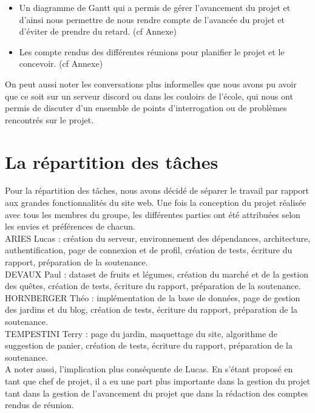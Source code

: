 \documentclass[12pt,titlepage]{report}
\begin{document}
\begin{itemize}
    \item Un diagramme de Gantt qui a permis de gérer l’avancement du projet et d’ainsi nous permettre de nous rendre compte de l’avancée du projet et d’éviter de prendre du retard. (cf Annexe)

    \item Les compte rendus des différentes réunions pour planifier le projet et le concevoir. (cf Annexe) \\
\end{itemize}


On peut aussi noter les conversations plus informelles que nous avons pu avoir que ce soit sur un serveur discord ou dans les couloirs de l’école, qui nous ont permis de discuter d’un ensemble de points d’interrogation ou de problèmes rencontrés sur le projet.

\section{La répartition des tâches}
Pour la répartition des tâches, nous avons décidé de séparer le travail par rapport aux grandes fonctionnalités du site web. 
Une fois la conception du projet réalisée avec tous les membres du groupe, les différentes parties ont été attribuées selon les envies et préférences de chacun.  \\


ARIES Lucas : création du serveur, environnement des dépendances, architecture, authentification, page de connexion et de profil, création de tests, écriture du rapport, préparation de la soutenance. \\


DEVAUX Paul : dataset de fruits et légumes, création du marché et de la gestion des quêtes, création de tests, écriture du rapport, préparation de la soutenance. \\


HORNBERGER Théo : implémentation de la base de données, page de gestion des jardins et du blog, création de tests, écriture du rapport, préparation de la soutenance. \\


TEMPESTINI Terry : page du jardin, maquettage du site, algorithme de suggestion de panier, création de tests,  écriture du rapport, préparation de la soutenance. \\


A noter aussi, l’implication plus conséquente de Lucas. En s'étant proposé en tant que chef de projet, il a eu une part plus importante dans la gestion du projet tant dans la gestion de l’avancement du projet que dans la rédaction des comptes rendus de réunion.
\end{document}
